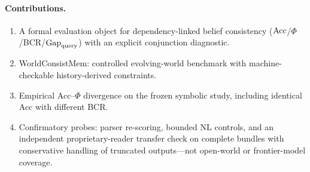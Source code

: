 \paragraph{Contributions.}
\begin{enumerate}[leftmargin=*,itemsep=1pt]
\item A formal evaluation object for dependency-linked belief consistency ($\mathrm{Acc}$/$\Phi$/BCR/$\mathrm{Gap}_{\mathrm{query}}$) with an explicit conjunction diagnostic.
\item WorldConsistMem: controlled evolving-world benchmark with machine-checkable history-derived constraints.
\item Empirical Acc--$\Phi$ divergence on the frozen symbolic study, including identical Acc with different BCR.
\item Confirmatory probes: parser re-scoring, bounded NL controls, and an independent proprietary-reader transfer check on complete bundles with conservative handling of truncated outputs---not open-world or frontier-model coverage.
\end{enumerate}
